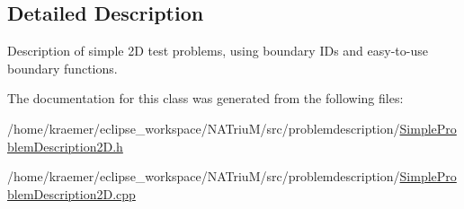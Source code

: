 \subsection{\-Detailed \-Description}
\-Description of simple 2\-D test problems, using boundary \-I\-Ds and easy-\/to-\/use boundary functions. 

\-The documentation for this class was generated from the following files\-:\begin{DoxyCompactItemize}
\item 
/home/kraemer/eclipse\-\_\-workspace/\-N\-A\-Triu\-M/src/problemdescription/\hyperlink{SimpleProblemDescription2D_8h}{\-Simple\-Problem\-Description2\-D.\-h}\item 
/home/kraemer/eclipse\-\_\-workspace/\-N\-A\-Triu\-M/src/problemdescription/\hyperlink{SimpleProblemDescription2D_8cpp}{\-Simple\-Problem\-Description2\-D.\-cpp}\end{DoxyCompactItemize}
